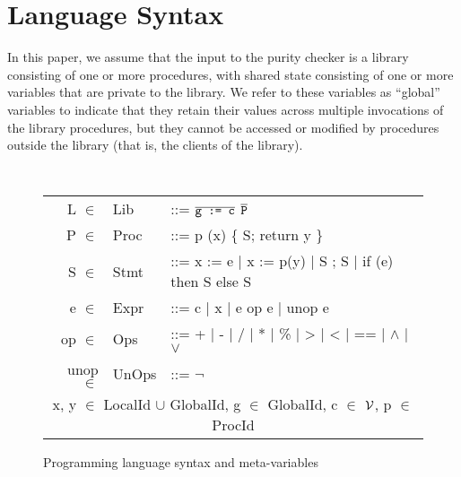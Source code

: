 \newcommand{\elt}{\ensuremath{\in} }
\newcommand{\domain}[1]{#1}

\section{Language Syntax}
\label{sec:background}

In this paper, we assume that the input to the purity checker is a library consisting
of one or more procedures, with shared state consisting of one or more variables
that are private to the library. We refer to these variables as ``global'' variables to
indicate that they retain their values across multiple invocations of the library
procedures, but they cannot be accessed or modified by procedures outside
the library (that is, the clients of the library).

\begin{figure}[t!]
{\tt
\begin{tabular}{rll}
L \elt & \domain{Lib} & ::= $\overline{\texttt{g := c}}$ $\overline{\texttt{P}}$ \\
P \elt & \domain{Proc} & ::= p (x) \{ S; return y \} \\
S \elt & \domain{Stmt} & ::=  x := e | x := p(y) | S ; S | if (e) then S else S \\
e \elt & \domain{Expr} & ::= c | x | e op e | unop e \\
op \elt & \domain{Ops} & ::= + | - | / | * | \% | > | < | == | $\wedge$ | $\vee$ \\
unop \elt & \domain{UnOps} & ::= $\neg$ \\
\multicolumn{3}{c}{
x, y \elt  \domain{LocalId} $\cup$ \domain{GlobalId},
g \elt \domain{GlobalId},
c \elt $\mathcal{V}$,
p \elt \domain{ProcId}
}
\end{tabular}
}
\caption{Programming language syntax and meta-variables}
 \label{fig:grammar}
\end{figure}

